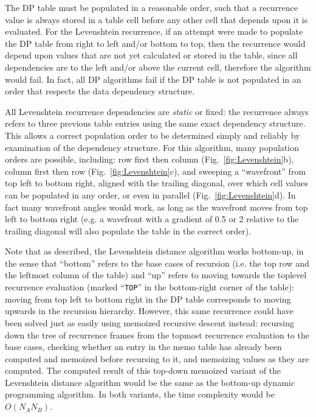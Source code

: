 \documentclass[manuscript,screen]{acmart}
\begin{document}
The DP table must be populated in a reasonable order, such that a recurrence value is always stored in a table cell before any other cell that depends upon it is evaluated. For the Levenshtein recurrence, if an attempt were made to populate the DP table from right to left and/or bottom to top, then the recurrence would depend upon values that are not yet calculated or stored in the table, since all dependencies are to the left and/or above the current cell, therefore the algorithm would fail. In fact, all DP algorithms fail if the DP table is not populated in an order that respects the data dependency structure.

All Levenshtein recurrence dependencies are \emph{static} or fixed: the recurrence always refers to three previous table entries using the same exact dependency structure. This allows a correct population order to be determined simply and reliably by examination of the dependency structure. For this algorithm, many population orders are possible, including: row first then column (Fig.~\ref{fig:Levenshtein}b), column first then row (Fig.~\ref{fig:Levenshtein}c), and sweeping a ``wavefront'' from top left to bottom right, aligned with the trailing diagonal, over which cell values can be populated in any order, or even in parallel (Fig.~\ref{fig:Levenshtein}d). In fact many wavefront angles would work, as long as the wavefront moves from top left to bottom right (e.g. a wavefront with a gradient of 0.5 or 2 relative to the trailing diagonal will also populate the table in the correct order).

Note that as described, the Levenshtein distance algorithm works bottom-up, in the sense that ``bottom'' refers to the base cases of recursion (i.e. the top row and the leftmost column of the table) and ``up'' refers to moving towards the toplevel recurrence evaluation (marked ``\texttt{TOP}'' in the bottom-right corner of the table): moving from top left to bottom right in the DP table corresponds to moving upwards in the recursion hierarchy. However, this same recurrence could have been solved just as easily using memoized recursive descent instead: recursing down the tree of recurrence frames from the topmost recurrence evaluation to the base cases, checking whether an entry in the memo table has already been computed and memoized before recursing to it, and memoizing values as they are computed. The computed result of this top-down memoized variant of the Levenshtein distance algorithm would be the same as the bottom-up dynamic programming algorithm. In both variants, the time complexity would be $O(N_A N_B)$.
\end{document}
